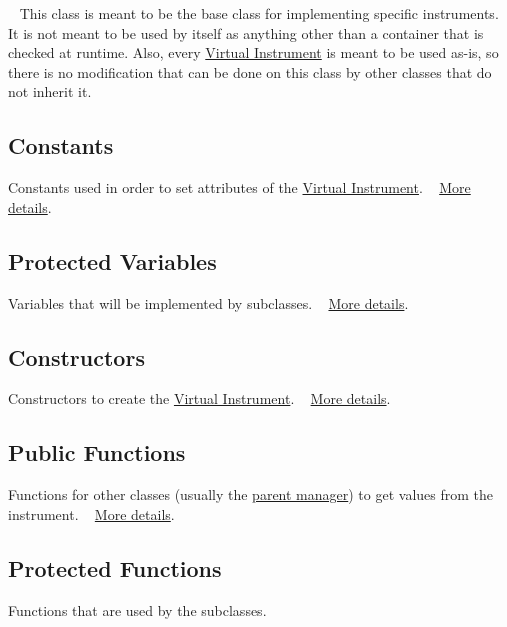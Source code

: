~\newline
 This class is meant to be the base class for implementing specific instruments. It is not meant to be used by itself as anything other than a container that is checked at runtime. Also, every \hyperlink{group___v_i}{Virtual Instrument} is meant to be used as-\/is, so there is no modification that can be done on this class by other classes that do not inherit it.\hypertarget{group___v_i_base_DocVIBaseConst}{}\subsection{Constants}\label{group___v_i_base_DocVIBaseConst}
Constants used in order to set attributes of the \hyperlink{group___v_i}{Virtual Instrument}. ~\newline
 \hyperlink{group___v_i_base_const}{More details}.\hypertarget{group___v_i_base_DocVIBaseProVar}{}\subsection{Protected Variables}\label{group___v_i_base_DocVIBaseProVar}
Variables that will be implemented by subclasses. ~\newline
 \hyperlink{group___v_i_base_pro_var}{More details}.\hypertarget{group___v_i_base_DocVIBaseConstruct}{}\subsection{Constructors}\label{group___v_i_base_DocVIBaseConstruct}
Constructors to create the \hyperlink{class_virtual_instrument}{Virtual Instrument}. ~\newline
 \hyperlink{group___v_i_base_construct}{More details}.\hypertarget{group___v_i_base_DocVIBasePubFunc}{}\subsection{Public Functions}\label{group___v_i_base_DocVIBasePubFunc}
Functions for other classes (usually the \hyperlink{group___v_i_m}{parent manager}) to get values from the instrument. ~\newline
 \hyperlink{group___v_i_base_pub_func}{More details}.\hypertarget{group___v_i_base_DocVIBaseProFunc}{}\subsection{Protected Functions}\label{group___v_i_base_DocVIBaseProFunc}
Functions that are used by the subclasses. ~\newline
